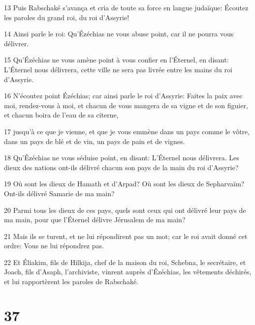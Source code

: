 \par 13 Puis Rabschaké s'avança et cria de toute sa force en langue judaïque: Écoutez les paroles du grand roi, du roi d'Assyrie!
\par 14 Ainsi parle le roi: Qu'Ézéchias ne vous abuse point, car il ne pourra vous délivrer.
\par 15 Qu'Ézéchias ne vous amène point à vous confier en l'Éternel, en disant: L'Éternel nous délivrera, cette ville ne sera pas livrée entre les mains du roi d'Assyrie.
\par 16 N'écoutez point Ézéchias; car ainsi parle le roi d'Assyrie: Faites la paix avec moi, rendez-vous à moi, et chacun de vous mangera de sa vigne et de son figuier, et chacun boira de l'eau de sa citerne,
\par 17 jusqu'à ce que je vienne, et que je vous emmène dans un pays comme le vôtre, dans un pays de blé et de vin, un pays de pain et de vignes.
\par 18 Qu'Ézéchias ne vous séduise point, en disant: L'Éternel nous délivrera. Les dieux des nations ont-ils délivré chacun son pays de la main du roi d'Assyrie?
\par 19 Où sont les dieux de Hamath et d'Arpad? Où sont les dieux de Sepharvaïm? Ont-ils délivré Samarie de ma main?
\par 20 Parmi tous les dieux de ces pays, quels sont ceux qui ont délivré leur pays de ma main, pour que l'Éternel délivre Jérusalem de ma main?
\par 21 Mais ils se turent, et ne lui répondirent pas un mot; car le roi avait donné cet ordre: Vous ne lui répondrez pas.
\par 22 Et Éliakim, fils de Hilkija, chef de la maison du roi, Schebna, le secrétaire, et Joach, fils d'Asaph, l'archiviste, vinrent auprès d'Ézéchias, les vêtements déchirés, et lui rapportèrent les paroles de Rabschaké.

\chapter{37}

